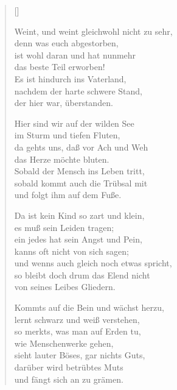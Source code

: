 \begin{multicols}{2}
\settowidth{\versewidth}{Weint, und weint gleichwohl nicht zu sehr,}
\begin{verse}[\versewidth]

 Weint, und weint gleichwohl nicht zu sehr,\\
denn was euch abgestorben,\\
ist wohl daran und hat nunmehr\\
das beste Teil erworben!\\
Es ist hindurch ins Vaterland,\\
nachdem der harte schwere Stand,\\
der hier war, überstanden.

 Hier sind wir auf der wilden See\\
im Sturm und tiefen Fluten,\\
da gehts uns, daß vor Ach und Weh\\
das Herze möchte bluten.\\
Sobald der Mensch ins Leben tritt,\\
sobald kommt auch die Trübsal mit\\
und folgt ihm auf dem Fuße.

 Da ist kein Kind so zart und klein,\\
es muß sein Leiden tragen;\\
ein jedes hat sein Angst und Pein,\\
kanns oft nicht von sich sagen;\\
und wenns auch gleich noch etwas spricht,\\
so bleibt doch drum das Elend nicht\\
von seines Leibes Gliedern.

 Kommts auf die Bein und wächst herzu,\\
lernt schwarz und weiß verstehen,\\
so merkts, was man auf Erden tu,\\
wie Menschenwerke gehen,\\
sieht lauter Böses, gar nichts Guts,\\
darüber wird betrübtes Muts\\
und fängt sich an zu grämen.


\end{verse}
\end{multicols}
